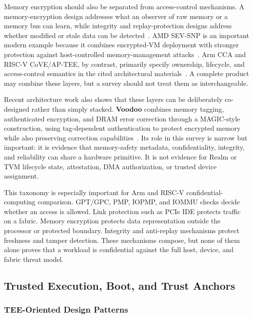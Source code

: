 Memory encryption should also be separated from access-control mechanisms. A memory-encryption design addresses what an observer of raw memory or a memory bus can learn, while integrity and replay-protection designs address whether modified or stale data can be detected~\cite{henson2014memory}. AMD SEV-SNP is an important modern example because it combines encrypted-VM deployment with stronger protection against host-controlled memory-management attacks~\cite{amd_sev_snp}. Arm CCA and RISC-V CoVE/AP-TEE, by contrast, primarily specify ownership, lifecycle, and access-control semantics in the cited architectural materials~\cite{arm_cca_spec,riscv_ap_tee_2024}. A complete product may combine these layers, but a survey should not treat them as interchangeable.

Recent architecture work also shows that these layers can be deliberately
co-designed rather than simply stacked. \textbf{Voodoo} combines memory tagging,
authenticated encryption, and DRAM error correction through a MAGIC-style
construction, using tag-dependent authentication to protect encrypted memory
while also preserving correction capabilities~\cite{lamster2024voodoo}. Its
role in this survey is narrow but important: it is evidence that memory-safety
metadata, confidentiality, integrity, and reliability can share a hardware
primitive. It is not evidence for Realm or TVM lifecycle state, attestation, DMA
authorization, or trusted device assignment.

This taxonomy is especially important for Arm and RISC-V confidential-computing comparison. GPT/GPC, PMP, IOPMP, and IOMMU checks decide whether an access is allowed. Link protection such as PCIe IDE protects traffic on a fabric. Memory encryption protects data representation outside the processor or protected boundary. Integrity and anti-replay mechanisms protect freshness and tamper detection. These mechanisms compose, but none of them alone proves that a workload is confidential against the full host, device, and fabric threat model.

\subsection{Trusted Execution, Boot, and Trust Anchors}

\subsubsection{TEE-Oriented Design Patterns}

